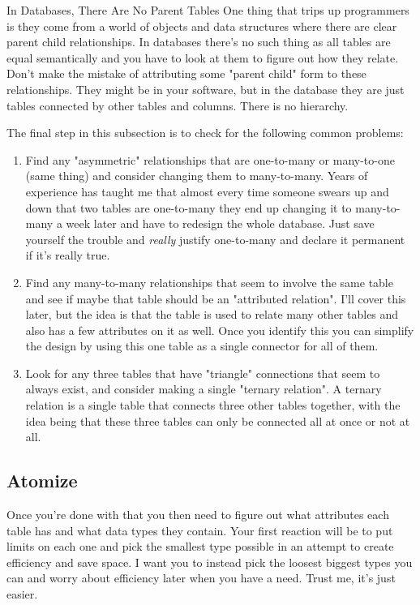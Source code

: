 \begin{note}{In Databases, There Are No Parent Tables}
One thing that trips up programmers is they come from a world of objects and data structures where
there are clear parent child relationships.  In databases there's no such thing as all tables
are equal semantically and you have to look at them to figure out how they relate.  Don't make
the mistake of attributing some "parent child" form to these relationships.  They might be
in your software, but in the database they are just tables connected by other tables and columns.
There is no hierarchy.
\end{note}

The final step in this subsection is to check for the following common problems:

\begin{enumerate}
\item Find any "asymmetric" relationships that are one-to-many or many-to-one (same thing) and 
    consider changing them to many-to-many.  Years of experience has taught me
    that almost every time someone swears up and down that two tables are one-to-many they end
    up changing it to many-to-many a week later and have to redesign the whole database.  Just
    save yourself the trouble and \emph{really} justify one-to-many and declare it permanent
    if it's really true.
\item Find any many-to-many relationships that seem to involve the same table and see if maybe
    that table should be an "attributed relation".  I'll cover this later, but the idea
    is that the table is used to relate many other tables and also has a few attributes on it
    as well.  Once you identify this you can simplify the design by using this one table as
    a single connector for all of them.
\item Look for any three tables that have "triangle" connections that seem to always exist, and
    consider making a single "ternary relation".  A ternary relation is a single table that
    connects three other tables together, with the idea being that these three tables can
    only be connected all at once or not at all.
\end{enumerate}


\subsection{Atomize}

Once you're done with that you then need to figure out what attributes each table has and what
data types they contain.  Your first reaction will be to put limits on each one and pick the smallest
type possible in an attempt to create efficiency and save space.  I want you to instead pick the loosest
biggest types you can and worry about efficiency later when you have a need.  Trust me, it's just
easier.

